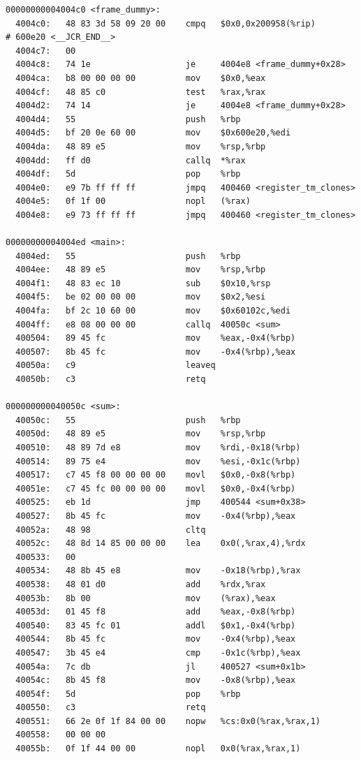 \documentclass[11pt]{article}
\begin{document}
\begin{enumerate}
\begin{verbatim}
00000000004004c0 <frame_dummy>:
  4004c0:	48 83 3d 58 09 20 00 	cmpq   $0x0,0x200958(%rip)        # 600e20 <__JCR_END__>
  4004c7:	00 
  4004c8:	74 1e                	je     4004e8 <frame_dummy+0x28>
  4004ca:	b8 00 00 00 00       	mov    $0x0,%eax
  4004cf:	48 85 c0             	test   %rax,%rax
  4004d2:	74 14                	je     4004e8 <frame_dummy+0x28>
  4004d4:	55                   	push   %rbp
  4004d5:	bf 20 0e 60 00       	mov    $0x600e20,%edi
  4004da:	48 89 e5             	mov    %rsp,%rbp
  4004dd:	ff d0                	callq  *%rax
  4004df:	5d                   	pop    %rbp
  4004e0:	e9 7b ff ff ff       	jmpq   400460 <register_tm_clones>
  4004e5:	0f 1f 00             	nopl   (%rax)
  4004e8:	e9 73 ff ff ff       	jmpq   400460 <register_tm_clones>

00000000004004ed <main>:
  4004ed:	55                   	push   %rbp
  4004ee:	48 89 e5             	mov    %rsp,%rbp
  4004f1:	48 83 ec 10          	sub    $0x10,%rsp
  4004f5:	be 02 00 00 00       	mov    $0x2,%esi
  4004fa:	bf 2c 10 60 00       	mov    $0x60102c,%edi
  4004ff:	e8 08 00 00 00       	callq  40050c <sum>
  400504:	89 45 fc             	mov    %eax,-0x4(%rbp)
  400507:	8b 45 fc             	mov    -0x4(%rbp),%eax
  40050a:	c9                   	leaveq 
  40050b:	c3                   	retq   

000000000040050c <sum>:
  40050c:	55                   	push   %rbp
  40050d:	48 89 e5             	mov    %rsp,%rbp
  400510:	48 89 7d e8          	mov    %rdi,-0x18(%rbp)
  400514:	89 75 e4             	mov    %esi,-0x1c(%rbp)
  400517:	c7 45 f8 00 00 00 00 	movl   $0x0,-0x8(%rbp)
  40051e:	c7 45 fc 00 00 00 00 	movl   $0x0,-0x4(%rbp)
  400525:	eb 1d                	jmp    400544 <sum+0x38>
  400527:	8b 45 fc             	mov    -0x4(%rbp),%eax
  40052a:	48 98                	cltq   
  40052c:	48 8d 14 85 00 00 00 	lea    0x0(,%rax,4),%rdx
  400533:	00 
  400534:	48 8b 45 e8          	mov    -0x18(%rbp),%rax
  400538:	48 01 d0             	add    %rdx,%rax
  40053b:	8b 00                	mov    (%rax),%eax
  40053d:	01 45 f8             	add    %eax,-0x8(%rbp)
  400540:	83 45 fc 01          	addl   $0x1,-0x4(%rbp)
  400544:	8b 45 fc             	mov    -0x4(%rbp),%eax
  400547:	3b 45 e4             	cmp    -0x1c(%rbp),%eax
  40054a:	7c db                	jl     400527 <sum+0x1b>
  40054c:	8b 45 f8             	mov    -0x8(%rbp),%eax
  40054f:	5d                   	pop    %rbp
  400550:	c3                   	retq   
  400551:	66 2e 0f 1f 84 00 00 	nopw   %cs:0x0(%rax,%rax,1)
  400558:	00 00 00 
  40055b:	0f 1f 44 00 00       	nopl   0x0(%rax,%rax,1)


\end{verbatim}
\end{enumerate}
\end{document}
